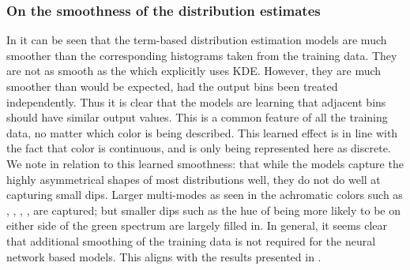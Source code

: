 \documentclass[11pt,a4paper]{article}
\begin{document}
\subsubsection{On the smoothness of the distribution estimates}\label{sec:learnedsmoothness}
In  it can be seen that the term-based distribution estimation models are much smoother than the corresponding histograms taken from the  training data.
They are not as smooth as the \empmodel{} which explicitly uses KDE.
However, they are much smoother than would be expected, had the output bins been treated independently.
Thus it is clear that the models are learning that adjacent bins should have similar output values.
This is a common feature of all the training data, no matter which color is being described.
This learned effect is in line with the fact that color is continuous, and is only being represented here as discrete.
We note in relation to this learned smoothness: that while the models capture the highly asymmetrical shapes of most distributions well, they do not do well at capturing small dips.
Larger multi-modes as seen in the achromatic colors such as , , , , are captured; but smaller dips such as the hue of  being more likely to be on either side of the green spectrum are largely filled in.
In general, it seems clear that additional smoothing of the training data is not required for the neural network based models.
This aligns with the results presented in .




\end{document}
